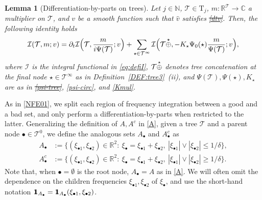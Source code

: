 \documentclass[a4paper,
11pt,  reqno]{amsart}
\makeatletter
\newcommand{\mathbbm}[1]{\mathchoice%
    {\hbox{\sffamily 1\kern-.40em 1}}%
    {\hbox{\sffamily 1\kern-.40em 1}}%
    {\hbox{\scriptsize\sffamily 1\kern-.30em 1}}%
    {\hbox{\tiny\sffamily 1\kern-.25em 1}}}%
\newcommand{\5}{\textup{V}}
\newcommand{\noi}{\noindent}
\newcommand{\ft}{\widehat}
\newcommand{\ind}{\mathbbm 1}
\newcommand{\les}{\lesssim}
\newcommand{\dt}{\partial_t}
\newtheorem{lemma}[theorem]{Lemma}
\theoremstyle{remark}
\newcommand{\R}{\mathbb{R}}
\newcommand{\bul}{\bullet}
\newcommand{\TT}{\mathcal{T}}
\newcommand{\Tr}{\mathrm{T}}
\newcommand{\N}{\mathbb{N}}
\def\<#1>{\csname MH@symb@#1\endcsname}
\newcommand{\Ical}{\mathcal{I}}
\numberwithin{equation}{section}
\numberwithin{theorem}{section}
\providecommand{\DIFaddtex}[1]{{\protect\color{blue}\uwave{#1}}} %
\providecommand{\DIFdeltex}[1]{{\protect\color{red}\sout{#1}}}                      %
\providecommand{\DIFaddbegin}{} %
\providecommand{\DIFaddend}{} %
\providecommand{\DIFdelbegin}{} %
\providecommand{\DIFdelend}{} %
\providecommand{\DIFadd}[1]{\texorpdfstring{\DIFaddtex{#1}}{#1}} %
\providecommand{\DIFdel}[1]{\texorpdfstring{\DIFdeltex{#1}}{}} %
\makeatother
\begin{document}
\begin{lemma}[Differentiation-by-parts on trees]
\label{LEM:IBP}
Let $j\in\N$, $\TT\in\Tr_j$, $m: \R^{\TT}\to \mathbb{C}$ a multiplier on $\TT$,
and $v$ be a smooth function such that $\ft v$ satisfies \DIFdelbegin \DIFdel{\eqref{dtv}}\DIFdelend \DIFaddbegin \DIFadd{\eqref{duhamel2}}\DIFaddend . Then, the following identity holds
\begin{align}\label{IBP}
\begin{split}
\Ical (\TT,m; v)
= \dt \Ical \Big(\TT,\frac{m}{ i \Psi(\TT)} ; v \Big)
+ \sum_{\star \in \TT^\infty} \Ical 
\Big(\TT \overset{\star}{\oplus} \<1>
, - K_\star \Psi_0(\star) \frac{m}{\Psi(\TT)} ; v \Big)
,
\end{split}
\end{align}
where $\Ical$ is the integral functional in \eqref{eq:defiI}, \DIFdelbegin \DIFdel{$\TT \overset{\star}{\oplus} \<1> $ }\DIFdelend \DIFaddbegin \DIFadd{$\TT \overset{\star}{\oplus} \<1>$ }\DIFaddend denotes tree concatenation at the final node $\star\in \TT^\infty$ as in Definition~\ref{DEF:tree3}~(ii), and \DIFdelbegin \DIFdel{$\Psi(\TT), \Psi(\star),  K_\star$ }\DIFdelend \DIFaddbegin \DIFadd{$\Psi(\TT)$, $\Psi(\star)$, $K_\star$ }\DIFaddend are as in \DIFdelbegin \DIFdel{\eqref{psi-tree}}\DIFdelend \DIFaddbegin \DIFadd{\eqref{psi0-tree}}\DIFaddend , \eqref{psi-circ}, and \eqref{Kmul}.

\end{lemma}



\noi
As in \eqref{NFE01}, we split each region of frequency integration between a good and a bad set, and only perform a differentiation-by-parts when restricted to the latter. Generalizing the definition of $A, A^c$ in \eqref{A}, given a tree $\TT$ and a parent node $\bul \in \TT^0$, we define the analogous sets $A_\bul$ and $A_\bul^c$ as
\begin{align}
A_\bul& 
:=
 \big\{ (\xi_{\bul1}, \xi_{\bul2}) \in \R^2: \ \xi_\bul =
\xi_{\bul1}
+ \xi_{\bul2}, \ |\xi_{\bul1}| \lor  |\xi_{\bul2}|  \le 1/\delta 
 \} , \\
A_\bul^c & := \big\{ (\xi_{\bul1}, \xi_{\bul2}) \in \R^2: \ \xi_\bul =
\xi_{\bul1} +
\xi_{\bul2},\
|\xi_{\bul1}| \lor |\xi_{\bul2}| \ge 1/\delta \big\} 
.
\label{defA}
\end{align}
Note that, when $\bul = \emptyset$ is the root node, $A_\bul =A$ as in \eqref{A}. 
We will often omit the dependence on the children frequencies $\xi_{\bul 1}, \xi_{\bul2}$ of $\xi_\bul$, and use the short-hand notation $\ind_{A_\bul}=\ind_{A_\bul} (\xi_{\bul1},\xi_{\bul2})$.
\end{document}
